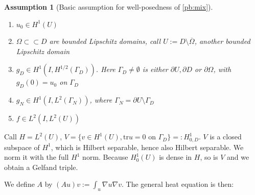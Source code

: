 \documentclass[english,a4paper,9pt,oneside]{scrbook}	%
\theoremstyle{break}
\newtheorem{ass}[equation]{Assumption}
\newtheorem{pb}[equation]{Problem}
\theoremstyle{remark}
\newcommand{\tr}{\text{tr}}
\newcommand{\cc}{\subset\subset}
\begin{document}
\begin{appendices}
\begin{ass}[Basic assumption for well-posedness of \cref{pb:mix}]
\label{ass:basic_par_mix}
\textcolor{white}{ }
\begin{enumerate}
	\item $u_0 \in H^1(U)$
	\item $\Omega \cc D$ are bounded Lipschitz domains, call $U:=D\setminus \overline{\Omega}$, another bounded Lipschitz domain
	\item $g_D \in H^1(I, H^{1/2}(\Gamma_D))$. Here $\Gamma_D\neq \emptyset$ is either $\partial U, \partial D $ or $\partial \Omega$, with $g_D(0) = u_0$ on $\Gamma_D$
	\item $g_N \in H^1(I, L^2(\Gamma_N))$, where $\Gamma_N = \partial U \setminus \Gamma_D$
	\item $f \in L^2(I, L^2(U))$
\end{enumerate}
\end{ass}



Call $H=L^2(U)$, $V=\{ v \in H^1(U), \tr u = 0 \text{ on } \Gamma_D\}=:H^1_{0,D}$. $V$ is a closed subspace of $H^1$, which is Hilbert separable, hence also Hilbert separable. We norm it with the full $H^1$ norm. Because $H^1_0(U)$ is dense in $H$, so is $V$ and we obtain a Gelfand triple. 


We define $A$ by $(Au)v:=\int_u\nabla u \nabla v$. The general heat equation is then:
%
%
%
%
%


\end{appendices}
\end{document}
